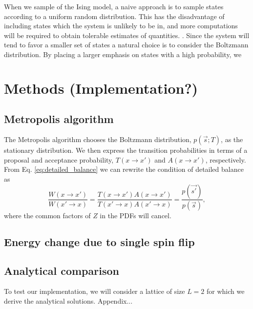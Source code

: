 When we sample  of the Ising model, a naive approach is to sample states  according to a uniform random distribution. This has the disadvantage of including  states which the system is unlikely to be in, and more computations will be required to obtain tolerable estimates of quantities. . Since the system will tend to favor a smaller set of states  a natural choice is to consider the Boltzmann distribution. By placing a larger emphasis on states with a high probability, we  


\section{Methods (Implementation?)}\label{sec:methods}

\subsection{Metropolis algorithm}\label{subsec_methods:metropolis}

The Metropolis algorithm chooses the Boltzmann distribution, $p(\vec{s};T)$, as the stationary distribution. We then express the transition probabilities in terms of a proposal and acceptance probability, $T(x\to x')$ and $A(x\to x')$, respectively. From Eq. \eqref{eq:detailed_balance} we can rewrite the condition of detailed balance as 
\begin{equation}
    \frac{W(x\to x')}{W(x'\to x)} = \frac{T(x\to x') A(x\to x')}{T(x' \to x) A(x'\to x)} = \frac{p(\vec{s'})}{p(\vec{s})},
\end{equation}  
where the common factors of $Z$ in the PDFs will cancel. 

\subsection{Energy change due to single spin flip}\label{subsec_methods:de_from_single_flip}


\subsection{Analytical comparison}\label{subsec_methods:analytical_test}
To test our implementation, we will consider a lattice of size $L=2$ for which we derive the analytical solutions. Appendix...  

